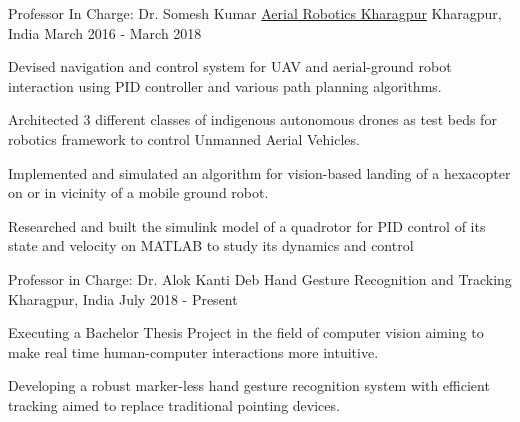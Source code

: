 

\begin{cventries}

  \cventry
    {Professor In Charge: Dr. Somesh Kumar} %
    {\href{http://www.aerialroboticskgp.org/}{Aerial Robotics Kharagpur}} %
    {Kharagpur, India} %
    {March 2016 - March 2018} %
    {
      \begin{cvitems} %
        \item {Devised navigation and control system for UAV and aerial-ground robot interaction using PID controller and various path planning algorithms.}
        \item {Architected 3 different classes of indigenous autonomous drones as test beds for robotics framework to control Unmanned Aerial Vehicles.}
        \item {Implemented and simulated an algorithm for vision-based landing of a hexacopter on or in vicinity of a mobile ground robot.}
        \item{Researched and built the simulink model of a quadrotor for PID control of its state and velocity on MATLAB to study its dynamics and control}
      \end{cvitems}
    }

  \cventry
    {Professor in Charge: Dr. Alok Kanti Deb} %
    {Hand Gesture Recognition and Tracking} %
    {Kharagpur, India} %
    {July 2018 - Present} %
    {
      \begin{cvitems} %
        \item {Executing a Bachelor Thesis Project in the field of computer vision aiming to make real time human-computer interactions more intuitive.}
        \item {Developing a robust marker-less hand gesture recognition system with efficient tracking aimed to replace traditional pointing devices.}
      \end{cvitems}
    }


\end{cventries}
